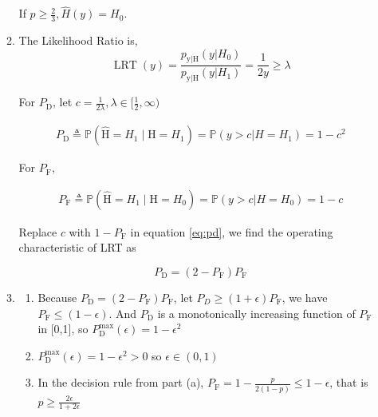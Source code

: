 \documentclass[a4paper]{article}
\begin{document}
\begin{enumerate}
\begin{enumerate}
  If $p\geqslant \frac {2}{3},  \hat H(y) = H_0$. 

  \item The Likelihood Ratio is,
  \begin{equation}
    \operatorname{LRT}(y) = \frac {p_{\mathrm{y} | \mathrm{H}}(y| H_0)}{p_{\mathrm{y} | \mathrm{H}}(y| H_1)} = \frac 1 {2y} \geqslant \lambda
  \end{equation}
  
  For $P_{\mathrm{D}}$, let $c = \frac {1}{2\lambda},\lambda \in [\frac 1 2,\infty)$

  \begin{equation}\label{eq:pd}
    \begin{aligned}
      P_{\mathrm{D}} \triangleq \mathbb{P}\left(\hat{\mathrm{H}}=H_{1} \mid \mathrm{H}=H_{1}\right) = \mathbb{P}(y> c | H = H_1) = 1-c^2
    \end{aligned}
  \end{equation}

  For $P_{\mathrm{F}}$,

  \begin{equation}
    \begin{aligned}
      P_{\mathrm{F}} \triangleq \mathbb{P}\left(\hat{\mathrm{H}}=H_{1} \mid \mathrm{H}=H_{0}\right) = \mathbb{P}(y> c | H = H_0) = 1-c
    \end{aligned}
  \end{equation}

  Replace $c$ with $1-P_{\mathrm{F}}$ in equation \ref{eq:pd}, we find the operating characteristic of LRT as

  \begin{equation}\label{eq:oc}
    P_{\mathrm{D}} = (2-P_{\mathrm{F}}) P_{\mathrm{F}}
  \end{equation}

  \item \begin{enumerate}
    \item Because $ P_{\mathrm{D}} = (2-P_{\mathrm{F}}) P_{\mathrm{F}}$, let $P_D \geqslant (1+\epsilon) P_{\mathrm{F}}$, we have  $P_{\mathrm{F}} \leqslant (1-\epsilon)$.  And  $P_{\mathrm{D}}$ is a monotonically increasing function of $P_{\mathrm{F}}$ in [0,1], so $P_{\mathrm{D}}^{\max}(\epsilon) = 1- \epsilon^2$ 
    \item $P_{\mathrm{D}}^{\max}(\epsilon) = 1- \epsilon^2 >0$ so $\epsilon \in (0,1)$ 
    \item In the decision rule from part (a), $P_{\mathrm{F}} = 1-\frac{p}{2(1-p)} \leqslant 1- \epsilon$, that is $p \geqslant \frac {2\epsilon}{1+2\epsilon}$
  \end{enumerate}
\end{enumerate}


\end{enumerate}
\end{document}
